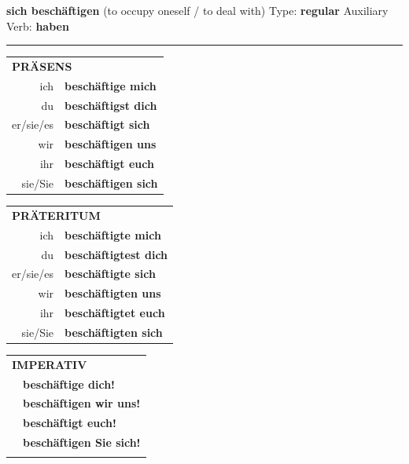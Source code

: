 \documentclass[10pt,a4paper]{revtex4-2}
\begin{document}
\begin{verbbox}
    {\Large \bf sich beschäftigen} (to occupy oneself / to deal with) \hfill Type: \textbf{regular} \hfill Auxiliary Verb: \textbf{haben} 
    
     \vspace{5pt}

    \hrule
    
    \vspace{5pt}

  \begin{tabular}{rl}
     \multicolumn{2}{l}{\textbf{PRÄSENS} }\\
    ich & \textbf{beschäftige mich}\\
    du & \textbf{beschäftigst dich}\\
    er/sie/es & \textbf{beschäftigt sich}\\
    wir & \textbf{beschäftigen uns}\\
    ihr & \textbf{beschäftigt euch}\\
    sie/Sie & \textbf{beschäftigen sich}\\
  \end{tabular}
  \hfill
     \begin{tabular}{rl}
    \multicolumn{2}{l}{\textbf{PRÄTERITUM} }\\
    ich & \textbf{beschäftigte mich}\\
    du & \textbf{beschäftigtest dich}\\
    er/sie/es & \textbf{beschäftigte sich}\\
    wir & \textbf{beschäftigten uns}\\
    ihr & \textbf{beschäftigtet euch}\\
    sie/Sie & \textbf{beschäftigten sich}\\
  \end{tabular}
  \hfill
  \begin{tabular}{rl}
     \multicolumn{2}{l}{\textbf{IMPERATIV} }\\
   & \textbf{beschäftige dich!}\\
   & \textbf{beschäftigen wir uns!}\\
   & \textbf{beschäftigt euch!}\\
   & \textbf{beschäftigen Sie sich!}\\
   & \vspace{10pt}
  \end{tabular}


\end{verbbox}
\end{document}
